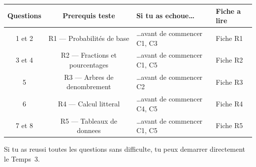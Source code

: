 \begin{center}
\begin{tabular}{|c|c|l|l|}
\hline
\textbf{Questions} & \textbf{Prerequis teste} & \textbf{Si tu as echoue\ldots} & \textbf{Fiche a lire} \\
\hline
1 et 2 & R1 --- Probabilités de base & \ldots avant de commencer C1, C3 & Fiche R1 \\
\hline
3 et 4 & R2 --- Fractions et pourcentages & \ldots avant de commencer C1, C5 & Fiche R2 \\
\hline
5 & R3 --- Arbres de denombrement & \ldots avant de commencer C2 & Fiche R3 \\
\hline
6 & R4 --- Calcul litteral & \ldots avant de commencer C4, C5 & Fiche R4 \\
\hline
7 et 8 & R5 --- Tableaux de donnees & \ldots avant de commencer C1, C5 & Fiche R5 \\
\hline
\end{tabular}
\end{center}

\bigskip

Si tu as reussi toutes les questions sans difficulte, tu peux demarrer directement le Temps~3.
